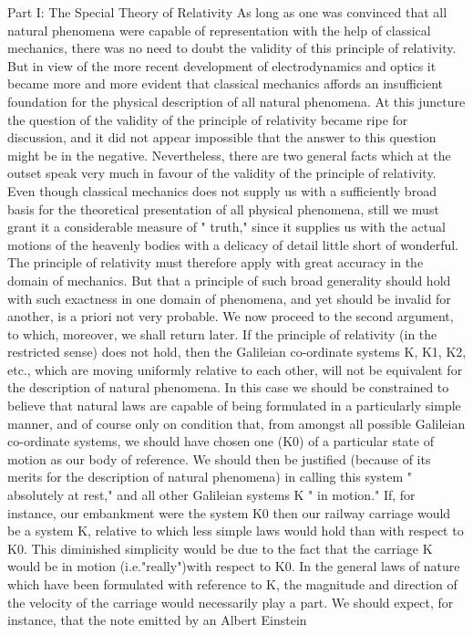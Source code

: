 \documentclass{article}
\begin{document}
Part I: The Special Theory of Relativity
As long as one was convinced that all natural phenomena were capable of representation
with the help of classical mechanics, there was no need to doubt the validity of this
principle of relativity. But in view of the more recent development of electrodynamics and
optics it became more and more evident that classical mechanics affords an insufficient
foundation for the physical description of all natural phenomena. At this juncture the
question of the validity of the principle of relativity became ripe for discussion, and it did
not appear impossible that the answer to this question might be in the negative.
Nevertheless, there are two general facts which at the outset speak very much in favour
of the validity of the principle of relativity. Even though classical mechanics does not
supply us with a sufficiently broad basis for the theoretical presentation of all physical
phenomena, still we must grant it a considerable measure of " truth," since it supplies us
with the actual motions of the heavenly bodies with a delicacy of detail little short of
wonderful. The principle of relativity must therefore apply with great accuracy in the
domain of mechanics. But that a principle of such broad generality should hold with such
exactness in one domain of phenomena, and yet should be invalid for another, is a priori
not very probable.
We now proceed to the second argument, to which, moreover, we shall return later. If the
principle of relativity (in the restricted sense) does not hold, then the Galileian co-ordinate
systems K, K1, K2, etc., which are moving uniformly relative to each other, will not be
equivalent for the description of natural phenomena. In this case we should be constrained
to believe that natural laws are capable of being formulated in a particularly simple manner,
and of course only on condition that, from amongst all possible Galileian co-ordinate
systems, we should have chosen one (K0) of a particular state of motion as our body of
reference. We should then be justified (because of its merits for the description of natural
phenomena) in calling this system " absolutely at rest," and all other Galileian systems K "
in motion." If, for instance, our embankment were the system K0 then our railway carriage
would be a system K, relative to which less simple laws would hold than with respect to K0.
This diminished simplicity would be due to the fact that the carriage K would be in motion
(i.e."really")with respect to K0. In the general laws of nature which have been formulated
with reference to K, the magnitude and direction of the velocity of the carriage would
necessarily play a part. We should expect, for instance, that the note emitted by an
Albert Einstein
\end{document}
